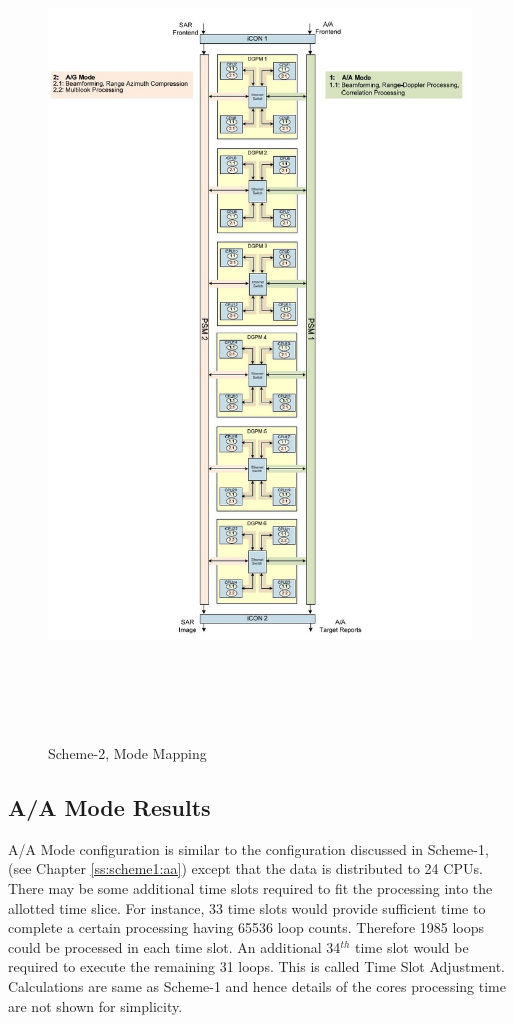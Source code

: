 \begin{figure}[h!]
	\centering
	\includegraphics[width=160mm, height=220mm]{figures/scheme2_mode_mapping}
	\caption{Scheme-2, Mode Mapping}
	\label{fig:existing_analysis:scheme2_mode_mapping}
\end{figure}
\clearpage

\subsection{A/A Mode Results}
\label{ss:scheme2:aa}
A/A Mode configuration is similar to the configuration discussed in Scheme-1, (see Chapter \ref{ss:scheme1:aa}) except that the data is distributed to 24 CPUs. There may be some additional time slots required to fit the processing into the allotted time slice. For instance, 33 time slots would provide sufficient time to complete a certain processing having 65536 loop counts. Therefore 1985 loops could be processed in each time slot. An additional 34$^{th}$ time slot would be required to execute the remaining 31 loops. This is called Time Slot Adjustment. Calculations are same as Scheme-1 and hence details of the cores processing time are not shown for simplicity.

